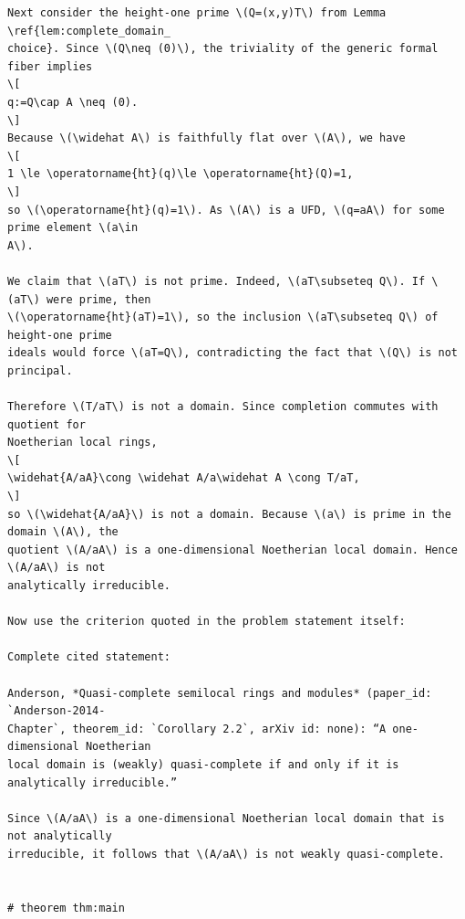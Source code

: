 \documentclass[]{pkuai4m}
\theoremstyle{plain}
\theoremstyle{definition}
\begin{document}
\begin{Verbatim}[commandchars=!??]
Next consider the height-one prime \(Q=(x,y)T\) from Lemma \ref{lem:complete_domain_
choice}. Since \(Q\neq (0)\), the triviality of the generic formal fiber implies
\[
q:=Q\cap A \neq (0).
\]
Because \(\widehat A\) is faithfully flat over \(A\), we have
\[
1 \le \operatorname{ht}(q)\le \operatorname{ht}(Q)=1,
\]
so \(\operatorname{ht}(q)=1\). As \(A\) is a UFD, \(q=aA\) for some prime element \(a\in 
A\).

We claim that \(aT\) is not prime. Indeed, \(aT\subseteq Q\). If \(aT\) were prime, then 
\(\operatorname{ht}(aT)=1\), so the inclusion \(aT\subseteq Q\) of height-one prime 
ideals would force \(aT=Q\), contradicting the fact that \(Q\) is not principal.

Therefore \(T/aT\) is not a domain. Since completion commutes with quotient for 
Noetherian local rings,
\[
\widehat{A/aA}\cong \widehat A/a\widehat A \cong T/aT,
\]
so \(\widehat{A/aA}\) is not a domain. Because \(a\) is prime in the domain \(A\), the 
quotient \(A/aA\) is a one-dimensional Noetherian local domain. Hence \(A/aA\) is not 
analytically irreducible.

Now use the criterion quoted in the problem statement itself:

Complete cited statement:

Anderson, *Quasi-complete semilocal rings and modules* (paper_id: `Anderson-2014-
Chapter`, theorem_id: `Corollary 2.2`, arXiv id: none): “A one-dimensional Noetherian 
local domain is (weakly) quasi-complete if and only if it is analytically irreducible.”

Since \(A/aA\) is a one-dimensional Noetherian local domain that is not analytically 
irreducible, it follows that \(A/aA\) is not weakly quasi-complete.


# theorem thm:main


\end{Verbatim}
\end{document}
